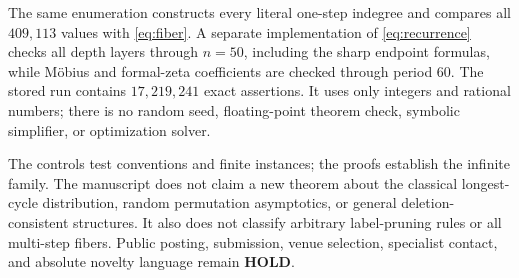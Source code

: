\documentclass[11pt,a4paper]{amsart}
\theoremstyle{definition}
\theoremstyle{remark}
\begin{document}
The same enumeration constructs every literal one-step indegree and compares
all $409{,}113$ values with \eqref{eq:fiber}.  A separate implementation of
\eqref{eq:recurrence} checks all depth layers through $n=50$, including the
sharp endpoint formulas, while M\"obius and formal-zeta coefficients are
checked through period $60$.  The stored run contains $17{,}219{,}241$ exact
assertions.  It uses only integers and rational numbers; there is no random
seed, floating-point theorem check, symbolic simplifier, or optimization
solver.

The controls test conventions and finite instances; the proofs establish
the infinite family.  The manuscript does not claim a new theorem about the
classical longest-cycle distribution, random permutation asymptotics, or
general deletion-consistent structures.  It also does not classify arbitrary
label-pruning rules or all multi-step fibers.  Public posting, submission,
venue selection, specialist contact, and absolute novelty language remain
\textbf{HOLD}.



\end{document}
